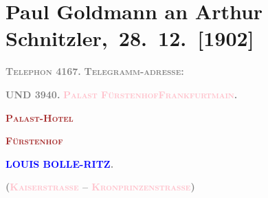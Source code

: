 

\renewcommand{\erwaehntePersonen}{Personen: Louis Bolle-Ritz, Theodore Rottenberg, Olga Schnitzler, ?? [Liebhaber von Theodore Rottenberg, Ende 1902 und Anfang 1903]}
\renewcommand{\erwaehnteInstitutionen}{Institutionen: Hotel Fürstenhof}
\renewcommand{\erwaehnteOrte}{Orte: Frankfurt am Main, Fürstenhof, Kaiserstraße, Münchener Straße, Wien}
\renewcommand{\erwaehnteWerke}{Werke: Neue Freie Presse}
\section[ Paul Goldmann an Arthur Schnitzler, 28. 12. {[}1902{]}]{Paul Goldmann an Arthur Schnitzler, 28. 12. {[}1902{]}}
\nopagebreak{}
\rehead{ }\normalsize\beginnumbering{}
\toendnotes[C]{\smallbreak\pagebreak[2]}
\toendnotes[C]{\smallbreak}
\pstart
           \noindent{}{\pb}\textcolor{gray}{\textbf{\textsc{Telephon}{ }4167.
                     }}\hfill \textcolor{gray}{\textbf{\textsc{Telegramm-adresse}:}}\pend
           
\pstart
           \textcolor{gray}{\textbf{UND{ }3940.
                     }}\hfill \textcolor{gray}{\textbf{\textsc{\textcolor{pink}{Palast Fürstenhof}{}\ledrightnote{\textcolor{pink}{Fürstenhof}}{ }\textcolor{pink}{Frankfurtmain}{}\ledrightnote{\textcolor{pink}{Frankfurt am Main}}.
                        }}}\pend
           
\pstart
           \centering{}\textcolor{gray}{\textbf{\textsc{\textbf{\textcolor{brown}{Palast-Hotel}{}\ledrightnote{\textcolor{brown}{Hotel Fürstenhof}}}}}}\pend
           
\pstart
           \noindent{}\centering{}\textcolor{gray}{\textbf{\textsc{\textcolor{brown}{Fürstenhof}{}\ledrightnote{\textcolor{brown}{Hotel Fürstenhof}}}}}\pend
           
\pstart
           \noindent{}\centering{}\textcolor{gray}{\textbf{\textcolor{blue}{LOUIS BOLLE-RITZ}{}\ledrightnote{\textcolor{blue}{Louis Bolle-Ritz}}.}}\pend
           
\pstart
           \noindent{}\centering{}\textcolor{gray}{\textbf{(\textsc{\textcolor{pink}{Kaiserstrasse}{}\ledrightnote{\textcolor{pink}{Kaiserstraße}} – \textcolor{pink}{Kronprinzenstrasse}{}\ledrightnote{\textcolor{pink}{Münchener Straße}}})}}\pend
           

